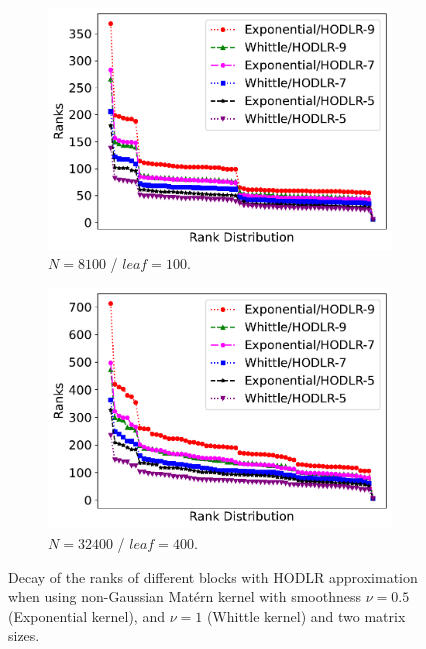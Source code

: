 \documentclass[conference]{IEEEtran}
\begin{document}
\begin{figure}
     \centering
     \begin{subfigure}[b]{0.24\textwidth}
         \centering
         \includegraphics[width=\textwidth]{./figures/ranks-decay-8100-hodlr.pdf}
         \caption{$N = 8100$ / $leaf = 100$.}
         \label{fig:hodlr-decay-8100}
     \end{subfigure}
     \begin{subfigure}[b]{0.24\textwidth}
         \centering
         \includegraphics[width=\textwidth]{./figures/ranks-decay-32400-hodlr.pdf}
         \caption{$N = 32400$ / $leaf = 400$.}
         \label{fig:hodlr-decay-32400}
     \end{subfigure}
        \caption{Decay of the ranks of different blocks with HODLR approximation when using non-Gaussian Mat\'ern kernel with smoothness $\nu =0.5$ (Exponential kernel), and $\nu=1$ (Whittle kernel) and two matrix sizes.}
        \label{fig:hodlr-decay}
\end{figure}
\end{document}

